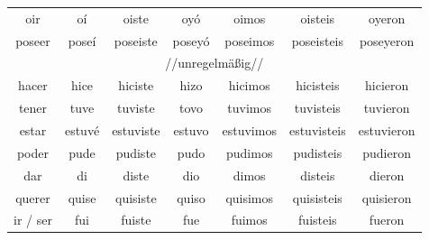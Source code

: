\begin{tabular}{ccccccc}
oir & oí & oiste & oyó & oimos & oisteis & oyeron \\
poseer & poseí & poseiste & poseyó & poseimos & poseisteis & poseyeron \\
\midrule
\multicolumn{7}{c}{//unregelmäßig//} \\
\midrule
hacer & hice & hiciste & hizo & hicimos & hicisteis & hicieron \\
tener & tuve & tuviste & tovo & tuvimos & tuvisteis & tuvieron \\
estar & estuvé & estuviste & estuvo & estuvimos & estuvisteis & estuvieron \\
poder & pude & pudiste & pudo & pudimos & pudisteis & pudieron \\
dar & di & diste & dio & dimos & disteis & dieron \\
querer & quise & quisiste & quiso & quisimos & quisisteis & quisieron \\
ir / ser & fui & fuiste & fue & fuimos & fuisteis & fueron \\
\bottomrule
\end{tabular}

